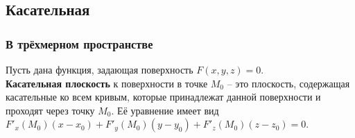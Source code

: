 \subsection{Касательная}
\subsubsection{В трёхмерном пространстве}
Пусть дана функция, задающая поверхность $F(x,y,z) = 0$.\\
\textbf{Касательная плоскость} к поверхности в точке $M_0$ – это плоскость, содержащая касательные ко всем кривым, которые принадлежат данной поверхности и проходят через точку $M_0$. Её уравнение имеет вид $F'_x(M_0)(x - x_0) + F'_y(M_0)(y - y_0) + F'_z(M_0)(z - z_0) = 0$.